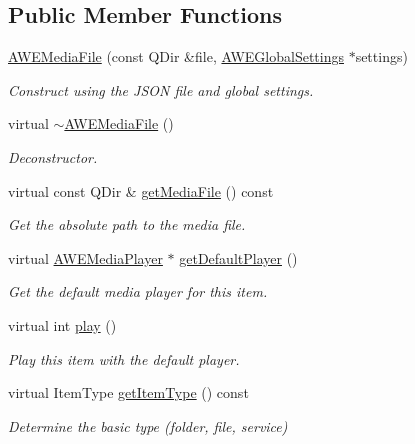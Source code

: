 \subsection*{Public Member Functions}
\begin{DoxyCompactItemize}
\item 
\hyperlink{class_a_w_e_media_file_a0a0cebc41f9b616342d8db39aa884a2e}{A\-W\-E\-Media\-File} (const Q\-Dir \&file, \hyperlink{class_a_w_e_global_settings}{A\-W\-E\-Global\-Settings} $\ast$settings)
\begin{DoxyCompactList}\small\item\em Construct using the J\-S\-O\-N file and global settings. \end{DoxyCompactList}\item 
\hypertarget{class_a_w_e_media_file_aec1b3a38b5b0d17b4736d1ea0ab14bb1}{virtual \hyperlink{class_a_w_e_media_file_aec1b3a38b5b0d17b4736d1ea0ab14bb1}{$\sim$\-A\-W\-E\-Media\-File} ()}\label{class_a_w_e_media_file_aec1b3a38b5b0d17b4736d1ea0ab14bb1}

\begin{DoxyCompactList}\small\item\em Deconstructor. \end{DoxyCompactList}\item 
virtual const Q\-Dir \& \hyperlink{class_a_w_e_media_file_a1de8772898fa7e5d8244fbf12786ed1a}{get\-Media\-File} () const 
\begin{DoxyCompactList}\small\item\em Get the absolute path to the media file. \end{DoxyCompactList}\item 
virtual \hyperlink{class_a_w_e_media_player}{A\-W\-E\-Media\-Player} $\ast$ \hyperlink{class_a_w_e_media_file_a31ec3e589f6afed8dad354af69d187ca}{get\-Default\-Player} ()
\begin{DoxyCompactList}\small\item\em Get the default media player for this item. \end{DoxyCompactList}\item 
virtual int \hyperlink{class_a_w_e_media_file_a6bc6142de751a0795ef132b04580636a}{play} ()
\begin{DoxyCompactList}\small\item\em Play this item with the default player. \end{DoxyCompactList}\item 
virtual Item\-Type \hyperlink{class_a_w_e_media_file_a60ede89821903429a2e5e3f7b6cf10a1}{get\-Item\-Type} () const 
\begin{DoxyCompactList}\small\item\em Determine the basic type (folder, file, service) \end{DoxyCompactList}\end{DoxyCompactItemize}
